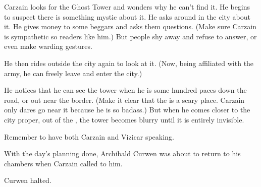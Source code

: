 \begin{comment}
  \section{Carzain looks for the Ghost Tower}
\end{comment}
\begin{garbage}
\new
Carzain looks for the Ghost Tower and wonders why he can't find it. 
He begins to suspect there is something mystic about it. 
He asks around in the city about it.
He gives money to some beggars and asks them questions. 
(Make sure Carzain is sympathetic so readers like him.)
But people shy away and refuse to answer, or even make warding gestures. 


He then rides outside the city again to look at it.
(Now, being affiliated with the army, he can freely leave and enter the city.)

He notices that he can see the tower when he is some hundred paces down the road, or out near the \wylde border. 
(Make it clear that the \wylde is a scary place. Carzain only dares go near it because he is so badass.)
But when he comes closer to the city proper, out of the \wylde, the tower becomes blurry until it is entirely invisible. 


Remember to have both Carzain and Vizicar speaking. 
 
\end{garbage}







\begin{comment}
  \section{Carzain asks Curwen about Ghost Tower}
\end{comment}

With the day's planning done, Archibald Curwen was about to return to his chambers when Carzain \Shachar called to him.


Curwen halted.

